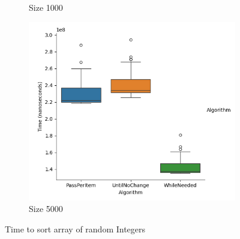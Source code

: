 \documentclass{article}
\begin{document}
\begin{figure}[ht]
\begin{subfigure}{0.3\textwidth}
    \caption{Size 1000}
    \label{fig:img2}
  \end{subfigure}
  \begin{subfigure}{0.3\textwidth}
    \centering
    \includegraphics[width=\linewidth]{../figureIntRandom5000.png}
    \caption{Size 5000}
    \label{fig:img3}
  \end{subfigure}
  \caption{Time to sort array of random Integers}
  \label{fig:three_images}
\end{figure}
\end{document}
